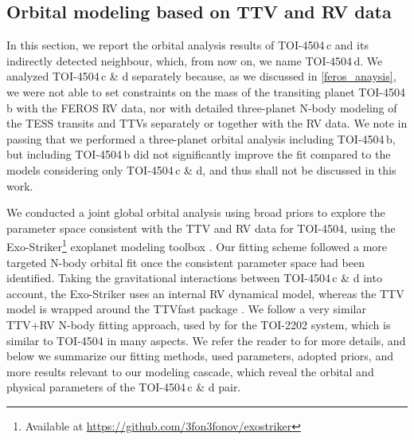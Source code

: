 \documentclass[twocolumn,twocolappendix]{aastex631}
\let\orgautoref\autoref
\renewcommand{\autoref}
        {\def\equationautorefname{Eq.}%
         \def\figureautorefname{Fig.}%
         \def\sectionautorefname{Sect.}%
         \def\subsectionautorefname{Sect.}%
         \def\subsubsectionautorefname{Sect.}%
         \orgautoref}
\begin{document}
\subsection{Orbital modeling based on TTV and RV data}
\label{nbody_models}


In this section, we report the orbital analysis results of TOI-4504\,c and its indirectly detected neighbour, which, from now on, we name TOI-4504\,d. We analyzed TOI-4504\,c \& d separately because, as we discussed in \autoref{feros_anaysis}, we were not able to set constraints on the mass of the transiting planet TOI-4504\,b with the FEROS RV data, nor with detailed three-planet N-body modeling of the TESS transits and TTVs 
separately or together with the RV data. We note in passing that we performed a three-planet orbital analysis including TOI-4504\,b, but including TOI-4504\,b did not significantly improve the fit compared to the models considering only TOI-4504\,c \& d, and thus shall not be discussed in this work. 


We conducted a joint global orbital analysis using broad priors to explore the parameter space consistent with the TTV and RV data for TOI-4504, using the {\textsc Exo-Striker}\footnote{Available at \url{https://github.com/3fon3fonov/exostriker}} exoplanet modeling toolbox \citep{exostriker}. Our fitting scheme followed a more targeted N-body orbital fit once the consistent parameter space had been identified.
Taking the gravitational 
interactions between TOI-4504\,c \& d into account, the {\textsc Exo-Striker} uses an internal RV dynamical model, whereas the TTV model is wrapped around the \mbox{\textsc TTVfast} package \citep{Deck2014}. We follow a very similar TTV+RV N-body fitting approach, used by \citet{TOI-2202} for the TOI-2202 system, which is similar to TOI-4504 in many aspects. We refer the reader to \citet{TOI-2202} for more details, and below we summarize our fitting methods, used parameters, adopted priors, and more results relevant to our modeling cascade, which reveal the orbital and physical parameters of the TOI-4504\,c \& d pair.
\end{document}
